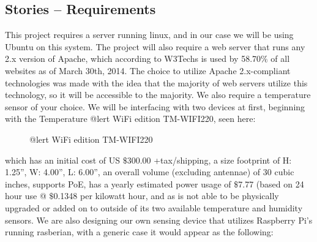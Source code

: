 \documentclass{report}
\begin{document}
\subsection*{Stories -- Requirements}
This project requires a server running linux, and in our case we will be using Ubuntu on this system. 
The project will also require a web server that runs any 2.x version of Apache, which according to W3Techs is used by 58.70$\%$ of all websites as of March 30th, 2014.
The choice to utilize Apache 2.x-compliant technologies was made with the idea that the majority of web servers utilize this technology, so it will be accessible to the majority. 
We also require a temperature sensor of your choice. 
We will be interfacing with two devices at first, beginning with the Temperature @lert WiFi edition TM-WIFI220, seen here:
\begin{figure}[H]
\caption{@lert WiFi edition TM-WIFI220}
\end{figure}
 which has an initial cost of US $\$$300.00 +tax/shipping, a size footprint of H: 1.25”, W: 4.00”, L: 6.00”, an overall volume (excluding antennae) of 30 cubic inches, supports PoE, has a yearly estimated power usage of $\$$7.77 (based on 24 hour use @ $\$$0.1348 per kilowatt hour, and as is not able to be physically upgraded or added on to outside of its two available temperature and humidity sensors.
\newline
\indent
We are also designing our own sensing device that utilizes Raspberry Pi’s running rasberian, with a generic case it would appear as the following:
\end{document}
